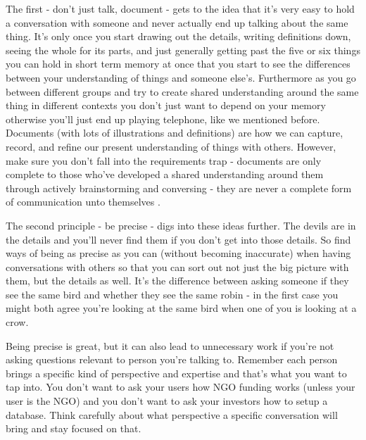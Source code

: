 \documentclass[11pt,a5paper]{book}
\begin{document}
The first - don't just talk, document - gets to the idea that it's very easy to hold a conversation with someone and never actually end up talking about the same thing. It's only once you start drawing out the details, writing definitions down, seeing the whole for its parts, and just generally getting past the five or six things you can hold in short term memory at once \cite{ericsson} that you start to see the differences between your understanding of things and someone else's. Furthermore as you go between different groups and try to create shared understanding around the same thing in different contexts you don't just want to depend on your memory otherwise you'll just end up playing telephone, like we mentioned before. Documents (with lots of illustrations and definitions) are how we can capture, record, and refine our present understanding of things with others. However, make sure you don't fall into the requirements trap - documents are only complete to those who've developed a shared understanding around them through actively brainstorming and conversing - they are never a complete form of communication unto themselves \cite{patton}.
\newline

The second principle - be precise - digs into these ideas further. The devils are in the details and you'll never find them if you don't get into those details. So find ways of being as precise as you can (without becoming inaccurate) when having conversations with others so that you can sort out not just the big picture with them, but the details as well. It's the difference between asking someone if they see the same bird and whether they see the same robin - in the first case you might both agree you're looking at the same bird when one of you is looking at a crow. 
\newline

Being precise is great, but it can also lead to unnecessary work if you're not asking questions relevant to person you're talking to. Remember each person brings a specific kind of perspective and expertise and that's what you want to tap into. You don't want to ask your users how NGO funding works (unless your user is the NGO) and you don't want to ask your investors how to setup a database. Think carefully about what perspective a specific conversation will bring and stay focused on that.
\newline
\end{document}
